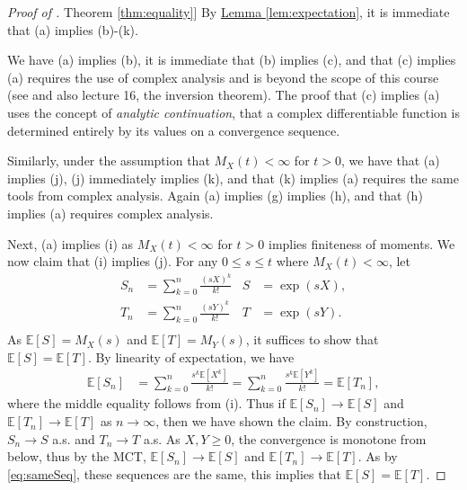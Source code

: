 \documentclass{article}
\theoremstyle{definition}
\newcommand{\E}{\mathbb E}
\newcommand{\1}{\mathbb I}
\newcommand{\thmhref}[1]{\hyperref[#1]{Theorem \ref{#1}}}
\newcommand{\lemhref}[1]{\hyperref[#1]{Lemma \ref{#1}}}
\begin{document}
\begin{proof}[Proof of \thmhref{thm:equality}]
  By \lemhref{lem:expectation}, it is immediate that (a) implies (b)-(k).
    
  We have (a) implies (b), it is immediate that (b) implies (c),
  and that (c) implies (a) requires the use of complex analysis and is
  beyond the scope of this course (see \cite{durrett2010probability}
  and also lecture 16, the inversion theorem).  The proof that (c)
  implies (a) uses the concept of \emph{analytic continuation}, that a
  complex differentiable function is determined entirely by its values
  on a convergence sequence.

  Similarly, under the assumption that $M_X(t) < \infty$ for $t > 0$,
  we have that (a) implies (j), (j) immediately implies (k), and that
  (k) implies (a) requires the same tools from complex analysis.
  Again (a) implies (g) implies (h), and that (h) implies (a) requires
  complex analysis.

  Next, (a) implies (i) as $M_X(t) < \infty$ for $t > 0$ implies finiteness of moments.  We now claim that
  (i) implies (j).  For any $0 \leq s \leq t$ where $M_X(t) < \infty$,
  let
  \begin{align*}
    S_n &= \sum_{k=0}^n \frac{(sX)^k}{k!}& S &= \exp(sX),\\
    T_n &= \sum_{k=0}^n \frac{(sY)^k}{k!}& T &= \exp(sY).\\
  \end{align*}
  As $\E[S] = M_X(s)$ and $\E[T] = M_Y(s)$, it suffices to show that $\E[S] = \E[T]$.
  By linearity of expectation, we have
  \begin{align}
    \label{eq:sameSeq}
    \E[S_n] &= \sum_{k=0}^n \frac{s^k\E[X^k]}{k!} = \sum_{k=0}^n \frac{s^k\E[Y^k]}{k!} = \E[T_n],
  \end{align}
  where the middle equality follows from (i).  Thus if $\E[S_n] \to
  \E[S]$ and $\E[T_n] \to \E[T]$ as $n \to \infty$, then we have shown
  the claim.  By construction, $S_n \to S$ a.s. and $T_n \to T$ a.s.
  As $X,Y \geq 0$, the convergence is monotone from below, thus by the
  MCT, $\E[S_n] \to \E[S]$ and $\E[T_n] \to \E[T]$.  As by
  \eqref{eq:sameSeq}, these sequences are the same, this implies that
  $\E[S] = \E[T]$.


\end{proof}
\end{document}
